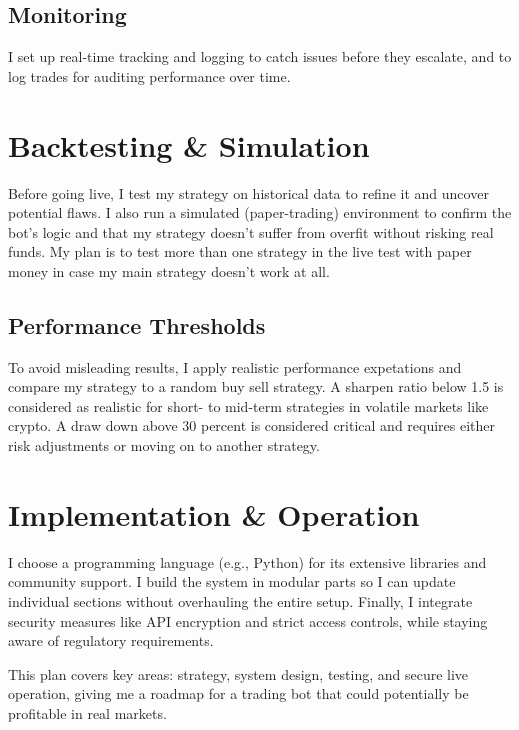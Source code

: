 \documentclass[9pt,a4paper,twocolumn,twoside]{tau-class/tau}
\begin{document}
\subsection{Monitoring}
I set up real-time tracking and logging to catch issues before they escalate, 
and to log trades for auditing performance over time.

\section{Backtesting \& Simulation}

Before going live, I test my strategy on historical data to refine it and 
uncover potential flaws. I also run a simulated (paper-trading) environment 
to confirm the bot’s logic and that my strategy doesn't suffer from overfit without risking real funds. My plan is to test more than one strategy in the live test with paper money in case my main strategy doesn't work at all.

\subsection{Performance Thresholds}
To avoid misleading results, I apply realistic performance expetations and compare my strategy to a random buy sell strategy.
A sharpen ratio below 1.5 is considered as realistic for short- to mid-term strategies in volatile markets like crypto.
A draw down above 30 percent is considered critical and requires either risk adjustments or moving on to another strategy. 

\section{Implementation \& Operation}

I choose a programming language (e.g., Python) for its extensive libraries 
and community support. I build the system in modular parts so I can update 
individual sections without overhauling the entire setup. Finally, I 
integrate security measures like API encryption and strict access 
controls, while staying aware of regulatory requirements.

\noindent
This plan covers key areas: strategy, system design, testing, and secure 
live operation, giving me a roadmap for a trading bot that could potentially 
be profitable in real markets.
\end{document}
